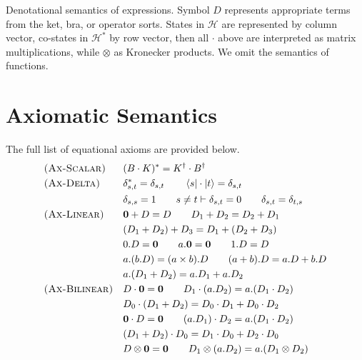 Denotational semantics of expressions. Symbol $D$ represents appropriate terms from the ket, bra, or operator sorts. States in $\mathcal{H}$ are represented by column vector, co-states in $\mathcal{H}^*$ by row vector, then all $\cdot$ above are interpreted as matrix multiplications, while $\otimes$ as Kronecker products.
We omit the semantics of functions.

\section{Axiomatic Semantics}
\label{sec: full axioms}
The full list of equational axioms are provided below.
{\allowdisplaybreaks
    \begin{align*}
        & \textsc{(Ax-Scalar)} &&
        (B \cdot K)^* = K^\dagger \cdot B^\dagger
        \\
            & \textsc{(Ax-Delta)} &&
        \delta_{s, t}^* = \delta_{s, t}
        \qquad
        \bra{s} \cdot \ket{t} = \delta_{s, t}
        \\ & &&
        \delta_{s, s} = 1
        \qquad
        s \neq t \vdash \delta_{s, t} = 0
        \qquad
        \delta_{s, t} = \delta_{t, s}
        \\
            & \textsc{(Ax-Linear)} &&
        \mathbf{0} + D = D
        \qquad
        D_1 + D_2 = D_2 + D_1
        \\ & &&
        (D_1 + D_2) + D_3 = D_1 + (D_2 + D_3)
        \\ & &&
        0.D = \mathbf{0}
        \qquad
        a.\mathbf{0} = \mathbf{0}
        \qquad
        1.D = D
        \\ & &&
        a.(b.D) = (a \times b).D
        \qquad
        (a + b).D = a.D + b.D
        \\ & &&
        a.(D_1 + D_2) = a.D_1 + a.D_2
        \\
        & \textsc{(Ax-Bilinear)} &&
        D \cdot \mathbf{0} = \mathbf{0} 
        \qquad
        D_1 \cdot (a.D_2) = a.(D_1 \cdot D_2)
        \\ & &&
        D_0 \cdot (D_1 + D_2) = D_0 \cdot D_1 + D_0 \cdot D_2
        \\ & &&
        \mathbf{0} \cdot D = \mathbf{0}
        \qquad
        (a.D_1) \cdot D_2 = a.(D_1 \cdot D_2)
        \\ & &&
        (D_1 + D_2) \cdot D_0 = D_1 \cdot D_0 + D_2 \cdot D_0
        \\ 
        & &&
        D \otimes \mathbf{0} = \mathbf{0}
        \qquad
        D_1 \otimes (a.D_2) = a.(D_1 \otimes D_2)

\end{align*}}
